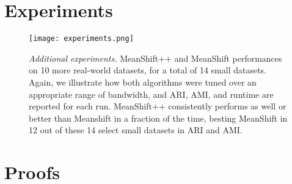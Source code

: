 \onecolumn

\section{Experiments}
\begin{figure}[H]
\begin{center}
\texttt{[image: experiments.png]}
\end{center}
   \caption{\label{fig:additional_experiments}\textit{Additional experiments.} MeanShift++ and MeanShift performances on 10 more real-world datasets, for a total of 14 small datasets. Again, we illustrate how both algorithms were tuned over an appropriate range of bandwidth, and ARI, AMI, and runtime are reported for each run. MeanShift++ consistently performs as well or better than Meanshift in a fraction of the time, besting MeanShift in 12 out of these 14 select small datasets in ARI and AMI.}
\end{figure}

\section{Proofs}

